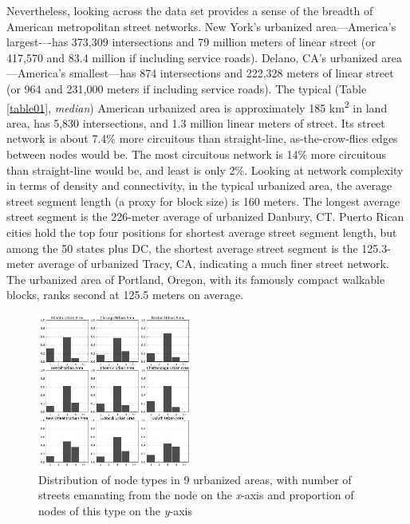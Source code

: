 \documentclass[Afour,sageh,times]{sage/sagej}
\begin{document}
Nevertheless, looking across the data set provides a sense of the breadth of American metropolitan street networks. New York's urbanized area---America's largest-–-has 373,309 intersections and 79 million meters of linear street (or 417,570 and 83.4 million if including service roads). Delano, CA's urbanized area---America's smallest---has 874 intersections and 222,328 meters of linear street (or 964 and 231,000 meters if including service roads). The typical (Table \ref{table01}, \emph{median}) American urbanized area is approximately 185 km\textsuperscript{2} in land area, has 5,830 intersections, and 1.3 million linear meters of street. Its street network is about 7.4\% more circuitous than straight-line, as-the-crow-flies edges between nodes would be. The most circuitous network is 14\% more circuitous than straight-line would be, and least is only 2\%. Looking at network complexity in terms of density and connectivity, in the typical urbanized area, the average street segment length (a proxy for block size) is 160 meters. The longest average street segment is the 226-meter average of urbanized Danbury, CT. Puerto Rican cities hold the top four positions for shortest average street segment length, but among the 50 states plus DC, the shortest average street segment is the 125.3-meter average of urbanized Tracy, CA, indicating a much finer street network. The urbanized area of Portland, Oregon, with its famously compact walkable blocks, ranks second at 125.5 meters on average.

\begin{figure}[h]
\includegraphics[width=0.45\textwidth]{media/fig02.png}
\caption{Distribution of node types in 9 urbanized areas, with number of streets emanating from the node on the \emph{x}-axis and proportion of nodes of this type on the \emph{y}-axis }
\label{fig02}
\end{figure}
\end{document}
